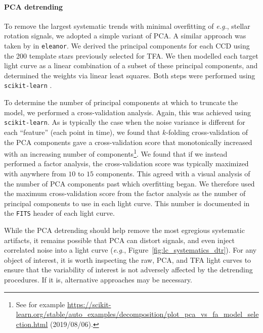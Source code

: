 \documentclass[12pt,twocolumn,tighten]{aastex62}
\begin{document}
\paragraph{PCA detrending}

To remove the largest systematic trends with minimal overfitting of
{\it e.g.}, stellar rotation signals, we adopted a simple variant of
PCA.
A similar approach was taken by \citet{feinstein_eleanor_2019} in
\texttt{eleanor}.  We derived the principal components for each CCD
using the 200 template stars previously selected for TFA.  We then
modelled each target light curve as a linear combination of a subset
of these principal components, and determined the weights via linear least
squares. Both steps were performed using \texttt{scikit-learn}
\citep{sklearn_2011}.

To determine the number of principal components at which to truncate
the model, we
performed a cross-validation analysis.
Again, this was achieved using \texttt{scikit-learn}.
As is typically the case when the noise variance is
different for each ``feature'' (each point in time), we found that
$k$-folding cross-validation of the PCA components
gave a cross-validation score that monotonically increased with
an increasing 
number of components\footnote{See for example
\url{https://scikit-learn.org/stable/auto_examples/decomposition/plot_pca_vs_fa_model_selection.html}
 (2019/08/06).}.
We found that if we instead performed a factor analysis, the
cross-validation
score was typically maximized with anywhere from $10$ to $15$ components.
This agreed with a
visual analysis of the number of PCA components past which overfitting
began.  We therefore used the maximum cross-validation score from
the factor analysis as the number of principal components to use in
each light curve.  This number is documented in the \texttt{FITS}
header of each light curve.

While the PCA detrending should help remove the most egregious
systematic artifacts, it remains possible that PCA can distort signals,
and even inject correlated noise into a light curve ({\it e.g.}, Figure~\ref{fig:lc_systematics_dtr}).
For any object of interest, it is worth inspecting the raw, PCA, and TFA
light curves to ensure
that the variability of interest is not adversely affected by the
detrending procedures.
If it is, alternative approaches may be necessary.

% 
\end{document}
